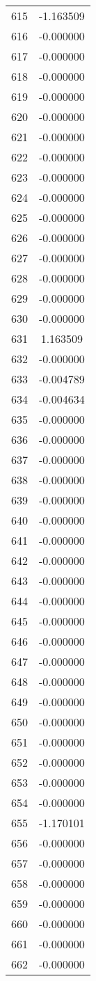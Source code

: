 \documentclass[12pt]{article}
\begin{document}
\begin{longtable}{@{}cc@{}}
615 & -1.163509 \\
616 & -0.000000 \\
617 & -0.000000 \\
618 & -0.000000 \\
619 & -0.000000 \\
620 & -0.000000 \\
621 & -0.000000 \\
622 & -0.000000 \\
623 & -0.000000 \\
624 & -0.000000 \\
625 & -0.000000 \\
626 & -0.000000 \\
627 & -0.000000 \\
628 & -0.000000 \\
629 & -0.000000 \\
630 & -0.000000 \\
631 & 1.163509 \\
632 & -0.000000 \\
633 & -0.004789 \\
634 & -0.004634 \\
635 & -0.000000 \\
636 & -0.000000 \\
637 & -0.000000 \\
638 & -0.000000 \\
639 & -0.000000 \\
640 & -0.000000 \\
641 & -0.000000 \\
642 & -0.000000 \\
643 & -0.000000 \\
644 & -0.000000 \\
645 & -0.000000 \\
646 & -0.000000 \\
647 & -0.000000 \\
648 & -0.000000 \\
649 & -0.000000 \\
650 & -0.000000 \\
651 & -0.000000 \\
652 & -0.000000 \\
653 & -0.000000 \\
654 & -0.000000 \\
655 & -1.170101 \\
656 & -0.000000 \\
657 & -0.000000 \\
658 & -0.000000 \\
659 & -0.000000 \\
660 & -0.000000 \\
661 & -0.000000 \\
662 & -0.000000 \\

\end{longtable}
\end{document}
